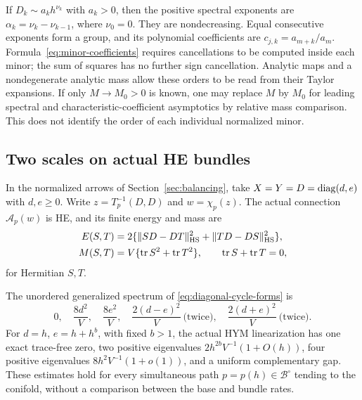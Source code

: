 If $D_k\sim a_k h^{\nu_k}$ with $a_k>0$, then the
positive spectral exponents are
$\alpha_k=\nu_k-\nu_{k-1}$, where $\nu_0=0$.
They are nondecreasing. Equal consecutive exponents form
a group, and its polynomial coefficients are
$c_{j,k}=a_{m+k}/a_m$. Formula~\eqref{eq:minor-coefficients}
requires cancellations to be computed inside each minor;
the sum of squares has no further sign cancellation.
Analytic maps and a nondegenerate analytic mass allow these
orders to be read from their Taylor expansions. If only
$M\to M_0>0$ is known, one may replace $M$ by $M_0$
for leading spectral and characteristic-coefficient
asymptotics by relative mass comparison. This does not
identify the order of each individual normalized minor.

\subsection{Two scales on actual HE bundles}

In the normalized arrows of Section~\ref{sec:balancing}, take
$X=Y=D=\operatorname{diag}(d,e)$ with $d,e\ge0$. Write
$z=T_p^{-1}(D,D)$ and $w=\chi_p(z)$.
The actual connection $\mathcal A_p(w)$ is HE, and its
finite energy and mass are
\begin{equation}\label{eq:diagonal-cycle-forms}
 \begin{split}
 E(S,T)&=2\{\|SD-DT\|_{\rm HS}^2+\|TD-DS\|_{\rm HS}^2\},\\
 M(S,T)&=V\{\operatorname{tr} S^2+\operatorname{tr} T^2\},\qquad \operatorname{tr} S+\operatorname{tr} T=0,
 \end{split}
\end{equation}
for Hermitian $S,T$.

\begin{proposition}\label{prop:two-cycle-spectrum}
The unordered generalized spectrum of
\eqref{eq:diagonal-cycle-forms} is
\begin{equation}\label{eq:two-cycle-spectrum}
 0,\quad\frac{8d^2}{V},\quad\frac{8e^2}{V},\quad
 \frac{2(d-e)^2}{V}\ \text{(twice)},\quad
 \frac{2(d+e)^2}{V}\ \text{(twice)}.
\end{equation}
For $d=h$, $e=h+h^b$, with fixed $b>1$, the actual
HYM linearization has one exact trace-free zero,
two positive eigenvalues
$2h^{2b}V^{-1}(1+O(h))$, four positive eigenvalues
$8h^2V^{-1}(1+o(1))$, and a uniform complementary gap.
These estimates hold for every simultaneous path
$p=p(h)\in\mathcal B^\circ$ tending to the conifold,
without a comparison between the base and bundle rates.
\end{proposition}

